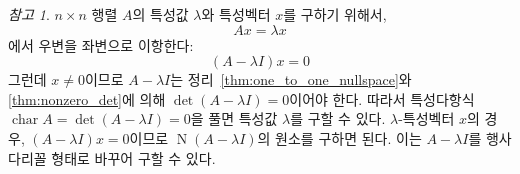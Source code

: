 \documentclass[unfonts,oneside,a4paper]{oblivoir}
\theoremstyle{definition}
\theoremstyle{theorem}
\theoremstyle{theorem}
\theoremstyle{remark}
\newtheorem*{remark}{참고}
\theoremstyle{remark}
\theoremstyle{remark}
\theoremstyle{remark}
\renewcommand{\vec}[1]{\bm{\mathit{#1}}}
\newcommand{\vecz}{\bm{\mathrm{0}}}
\DeclareMathOperator{\Null}{N}
\DeclareMathOperator{\Char}{char}
\begin{document}
\begin{remark}
    $n \times n$ 행렬 $A$의 특성값 $\lambda$와 특성벡터 $\vec x$를 구하기 위해서,
    \begin{equation*}
        A \vec x = \lambda \vec x
    \end{equation*}
    에서 우변을 좌변으로 이항한다:
    \begin{equation*}
        (A - \lambda I) \vec x = \vecz
    \end{equation*}
    그런데 $\vec x \neq \vecz$이므로 $A - \lambda I$는 정리~\ref{thm:one_to_one_nullspace}와 \ref{thm:nonzero_det}에 의해 $\det (A - \lambda I) = 0$이어야 한다.
    따라서 특성다항식 $\Char A = \det (A - \lambda I) = 0$을 풀면 특성값 $\lambda$를 구할 수 있다.
    $\lambda$-특성벡터 $\vec x$의 경우, $(A - \lambda I) \vec x = \vecz$이므로 $\Null (A - \lambda I)$의 원소를 구하면 된다.
    이는 $A - \lambda I$를 행사다리꼴 형태로 바꾸어 구할 수 있다.
\end{remark}
\end{document}
